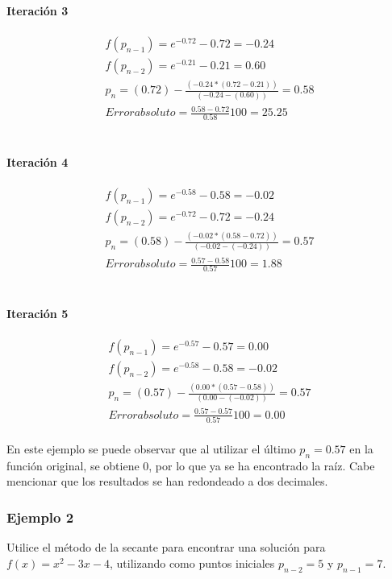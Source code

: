 \paragraph{Iteración 3}
\begin{gather*}
    f(p_{n-1}) = e^{-0.72} - 0.72 = -0.24 \\
    f(p_{n-2}) = e^{-0.21} - 0.21 = 0.60 \\
    p_n = (0.72)- \frac{(-0.24*(0.72-0.21))}{(-0.24-(0.60))} = 0.58 \\
    Error absoluto = \frac{0.58-0.72}{0.58}100 = 25.25
\end{gather*} \\

\paragraph{Iteración 4}
\begin{gather*}
    f(p_{n-1}) = e^{-0.58} - 0.58 = -0.02 \\
    f(p_{n-2}) = e^{-0.72} - 0.72 = -0.24 \\
    p_n = (0.58)- \frac{(-0.02*(0.58-0.72))}{(-0.02-(-0.24))} = 0.57 \\
    Error absoluto = \frac{0.57-0.58}{0.57}100 = 1.88
\end{gather*} \\

\paragraph{Iteración 5}
\begin{gather*}
    f(p_{n-1}) = e^{-0.57} - 0.57 = 0.00 \\
    f(p_{n-2}) = e^{-0.58} - 0.58 = -0.02 \\
    p_n = (0.57)- \frac{(0.00*(0.57-0.58))}{(0.00-(-0.02))} = 0.57 \\
    Error absoluto = \frac{0.57-0.57}{0.57}100 = 0.00
\end{gather*} \\

En este ejemplo se puede observar que al utilizar el último $p_n = 0.57$ en la función original, se obtiene $0$, por lo que ya se ha encontrado la raíz. Cabe mencionar que los resultados se han redondeado a dos decimales.


\subsubsection{Ejemplo 2} 
Utilice el método de la secante para encontrar una solución para $f(x) = x^{2} - 3x - 4$, utilizando como puntos iniciales $p_{n-2} = 5$ y $p_{n-1} = 7$. \\\\

